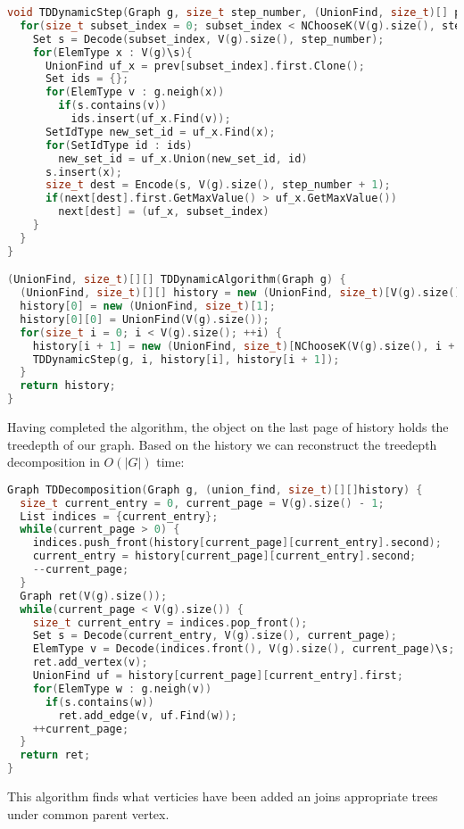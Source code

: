\begin{lstlisting}[language=C++]
void TDDynamicStep(Graph g, size_t step_number, (UnionFind, size_t)[] prev, (UnionFind, size_t)[] next){
  for(size_t subset_index = 0; subset_index < NChooseK(V(g).size(), step_number); ++subset_index) {
    Set s = Decode(subset_index, V(g).size(), step_number);
    for(ElemType x : V(g)\s){
      UnionFind uf_x = prev[subset_index].first.Clone();
      Set ids = {};
      for(ElemType v : g.neigh(x))
        if(s.contains(v))
          ids.insert(uf_x.Find(v));
      SetIdType new_set_id = uf_x.Find(x);
      for(SetIdType id : ids)
        new_set_id = uf_x.Union(new_set_id, id)
      s.insert(x);
      size_t dest = Encode(s, V(g).size(), step_number + 1);
      if(next[dest].first.GetMaxValue() > uf_x.GetMaxValue())
        next[dest] = (uf_x, subset_index)
    }
  }
}

(UnionFind, size_t)[][] TDDynamicAlgorithm(Graph g) {
  (UnionFind, size_t)[][] history = new (UnionFind, size_t)[V(g).size()][];
  history[0] = new (UnionFind, size_t)[1];
  history[0][0] = UnionFind(V(g).size());
  for(size_t i = 0; i < V(g).size(); ++i) {
    history[i + 1] = new (UnionFind, size_t)[NChooseK(V(g).size(), i + 1)];
    TDDynamicStep(g, i, history[i], history[i + 1]);
  }
  return history;
}
\end{lstlisting}
Having completed the algorithm, the object on the last page of history holds the treedepth of our graph. Based on the history we can reconstruct the treedepth decomposition in $O(|G|)$ time:
\begin{lstlisting}[language=C++]
Graph TDDecomposition(Graph g, (union_find, size_t)[][]history) {
  size_t current_entry = 0, current_page = V(g).size() - 1;
  List indices = {current_entry};
  while(current_page > 0) {
    indices.push_front(history[current_page][current_entry].second);
    current_entry = history[current_page][current_entry].second;
    --current_page;
  }
  Graph ret(V(g).size());
  while(current_page < V(g).size()) {
    size_t current_entry = indices.pop_front();
    Set s = Decode(current_entry, V(g).size(), current_page);
    ElemType v = Decode(indices.front(), V(g).size(), current_page)\s;
    ret.add_vertex(v);
    UnionFind uf = history[current_page][current_entry].first;
    for(ElemType w : g.neigh(v))
      if(s.contains(w))
        ret.add_edge(v, uf.Find(w));
    ++current_page;
  }
  return ret;
}
\end{lstlisting}
This algorithm finds what verticies have been added an joins appropriate trees under common parent vertex.
